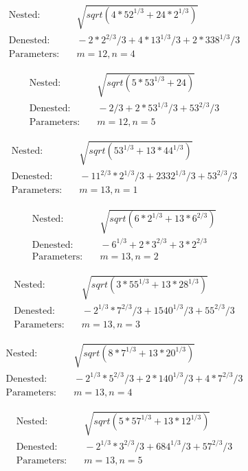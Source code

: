 \begin{align*}
\text{Nested:} &\quad \sqrt{sqrt(4*52^{1/3} + 24*2^{1/3})} \\
\text{Denested:} &\quad -2*2^{2/3}/3 + 4*13^{1/3}/3 + 2*338^{1/3}/3 \\
\text{Parameters:} &\quad m=12, n=4
\end{align*}

\begin{align*}
\text{Nested:} &\quad \sqrt{sqrt(5*53^{1/3} + 24)} \\
\text{Denested:} &\quad -2/3 + 2*53^{1/3}/3 + 53^{2/3}/3 \\
\text{Parameters:} &\quad m=12, n=5
\end{align*}

\begin{align*}
\text{Nested:} &\quad \sqrt{sqrt(53^{1/3} + 13*44^{1/3})} \\
\text{Denested:} &\quad -11^{2/3}*2^{1/3}/3 + 2332^{1/3}/3 + 53^{2/3}/3 \\
\text{Parameters:} &\quad m=13, n=1
\end{align*}

\begin{align*}
\text{Nested:} &\quad \sqrt{sqrt(6*2^{1/3} + 13*6^{2/3})} \\
\text{Denested:} &\quad -6^{1/3} + 2*3^{2/3} + 3*2^{2/3} \\
\text{Parameters:} &\quad m=13, n=2
\end{align*}

\begin{align*}
\text{Nested:} &\quad \sqrt{sqrt(3*55^{1/3} + 13*28^{1/3})} \\
\text{Denested:} &\quad -2^{1/3}*7^{2/3}/3 + 1540^{1/3}/3 + 55^{2/3}/3 \\
\text{Parameters:} &\quad m=13, n=3
\end{align*}

\begin{align*}
\text{Nested:} &\quad \sqrt{sqrt(8*7^{1/3} + 13*20^{1/3})} \\
\text{Denested:} &\quad -2^{1/3}*5^{2/3}/3 + 2*140^{1/3}/3 + 4*7^{2/3}/3 \\
\text{Parameters:} &\quad m=13, n=4
\end{align*}

\begin{align*}
\text{Nested:} &\quad \sqrt{sqrt(5*57^{1/3} + 13*12^{1/3})} \\
\text{Denested:} &\quad -2^{1/3}*3^{2/3}/3 + 684^{1/3}/3 + 57^{2/3}/3 \\
\text{Parameters:} &\quad m=13, n=5
\end{align*}

